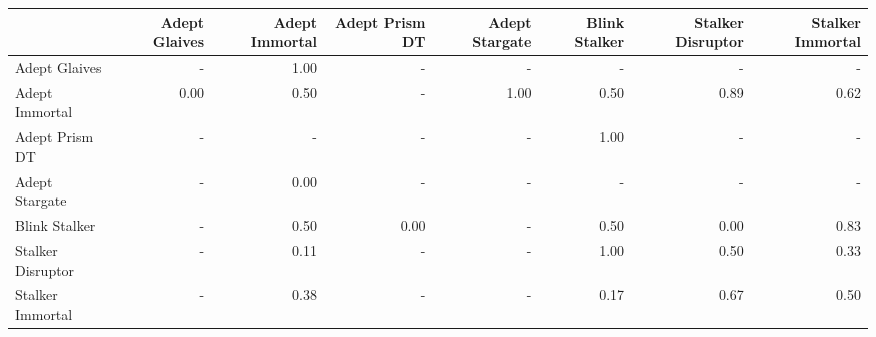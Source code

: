 \begin{tabular}{lrrrrrrr}
\toprule
{} &  Adept Glaives &  Adept Immortal &  Adept Prism DT &  Adept Stargate &  Blink Stalker &  Stalker Disruptor &  Stalker Immortal \\
\midrule
Adept Glaives     &            - &            1.00 &             - &             - &            - &                - &               - \\
Adept Immortal    &           0.00 &            0.50 &             - &            1.00 &           0.50 &               0.89 &              0.62 \\
Adept Prism DT    &            - &             - &             - &             - &           1.00 &                - &               - \\
Adept Stargate    &            - &            0.00 &             - &             - &            - &                - &               - \\
Blink Stalker     &            - &            0.50 &            0.00 &             - &           0.50 &               0.00 &              0.83 \\
Stalker Disruptor &            - &            0.11 &             - &             - &           1.00 &               0.50 &              0.33 \\
Stalker Immortal  &            - &            0.38 &             - &             - &           0.17 &               0.67 &              0.50 \\
\bottomrule
\end{tabular}
